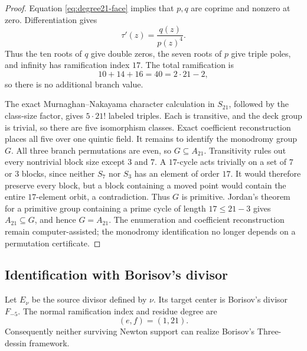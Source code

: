 \begin{proof}
Equation \eqref{eq:degree21-face} implies that \(p,q\) are coprime and
nonzero at zero.  Differentiation gives
\[
\tau'(z)=\frac{q(z)}{p(z)^4}.
\]
Thus the ten roots of \(q\) give double zeros, the seven roots of \(p\)
give triple poles, and infinity has ramification index \(17\).  The total
ramification is
\[
10+14+16=40=2\cdot21-2,
\]
so there is no additional branch value.

The exact Murnaghan--Nakayama character calculation in \(S_{21}\), followed
by the class-size factor, gives \(5\cdot21!\) labeled triples.  Each is
transitive, and the deck group is trivial, so there are five isomorphism
classes.  Exact coefficient reconstruction places all five over one
quintic field.  It remains to identify the monodromy group \(G\).  All three
branch permutations are even, so \(G\subseteq A_{21}\).  Transitivity rules
out every nontrivial block size except \(3\) and \(7\).  A \(17\)-cycle acts
trivially on a set of \(7\) or \(3\) blocks, since neither \(S_7\) nor \(S_3\)
has an element of order \(17\).  It would therefore preserve every block,
but a block containing a moved point would contain the entire
\(17\)-element orbit, a contradiction.  Thus \(G\) is primitive.  Jordan's
theorem for a primitive group containing a prime cycle of length
\(17\le21-3\) gives \(A_{21}\subseteq G\), and hence \(G=A_{21}\).
The enumeration and coefficient reconstruction remain computer-assisted;
the monodromy identification no longer depends on a permutation
certificate.
\end{proof}

\subsection{Identification with Borisov's divisor}

\begin{theorem}
\label{thm:borisov-fminusfive}
Let \(E_\nu\) be the source divisor defined by \(\nu\).  Its target center is
Borisov's divisor \(F_{-5}\).  The normal ramification index and residue
degree are
\[
(e,f)=(1,21).
\]
Consequently neither surviving Newton support can realize Borisov's
Three-dessin framework.
\end{theorem}

